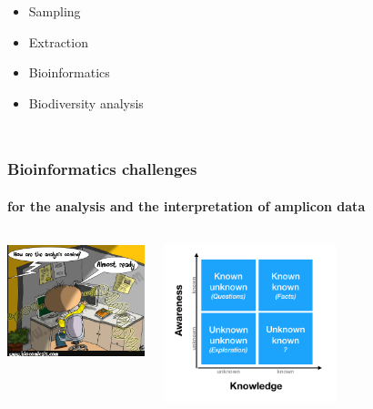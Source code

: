 \documentclass{beamer}
\begin{document}
\begin{frame}
\begin{singlespace}
\begin{columns}[onlytextwidth]
               \begin{itemize}
                  \item Sampling
                  \item Extraction
                  \item Bioinformatics
                  \item Biodiversity analysis
               \end{itemize}
               

         \end{columns}

      \end{singlespace}
   \end{frame}

   \begin{frame}
      \frametitle{Bioinformatics challenges}
      \framesubtitle{for the analysis and the interpretation of amplicon data}

      \begin{columns}[onlytextwidth]


            \includegraphics[width=40mm]{resources/bioinfo_mess.png}


            \includegraphics[width=50mm]{resources/known_unknown.png}
         
      \end{columns}
   \end{frame}

\end{document}
